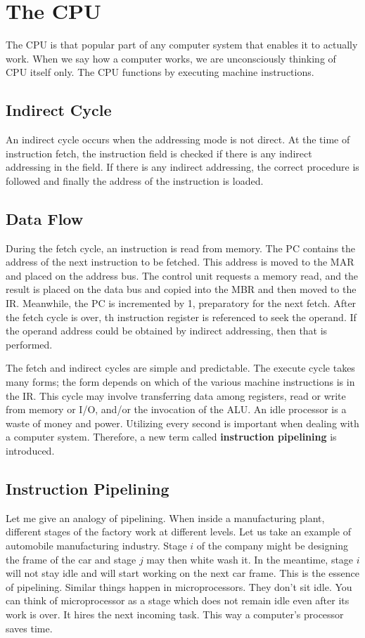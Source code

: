 \documentclass{article}
\begin{document}
\section{The CPU}
The CPU is that popular part of any computer system that enables it to actually work. When we say how a computer works, we are unconsciously thinking of CPU itself only. The CPU functions by executing machine instructions.

\subsection{Indirect Cycle}
An indirect cycle occurs when the addressing mode is not direct. At the time of instruction fetch, the instruction field is checked if there is any indirect addressing in the field. If there is any indirect addressing, the correct procedure is followed and finally the address of the instruction is loaded.

\subsection{Data Flow}
During the fetch cycle, an instruction is read from memory. The PC contains the address of the next instruction to be fetched. This address is moved to the MAR and placed on the address bus. The control unit requests a memory read, and the result is placed on the data bus and copied into the MBR and then moved to the IR. Meanwhile, the PC is incremented by 1, preparatory for the next fetch. After the fetch cycle is over, th instruction register is referenced to seek the operand. If the operand address could be obtained by indirect addressing, then that is performed. \par The fetch and indirect cycles are simple and predictable. The execute cycle takes many forms; the form depends on which of the various machine instructions is in the IR. This cycle may involve transferring data among registers, read or write from memory or I/O, and/or the invocation of the ALU. An idle processor is a waste of money and power. Utilizing every second is important when dealing with a computer system. Therefore, a new term called \textbf{instruction pipelining} is introduced.

\subsection{Instruction Pipelining}
Let me give an analogy of pipelining. When inside a manufacturing plant, different stages of the factory work at different levels. Let us take an example of automobile manufacturing industry. Stage $i$ of the company might be designing the frame of the car and stage $j$ may then white wash it. In the meantime, stage $i$ will not stay idle and will start working on the next car frame. This is the essence of pipelining. Similar things happen in microprocessors. They don't sit idle. You can think of microprocessor as a stage which does not remain idle even after its work is over. It hires the next incoming task. This way a computer's processor saves time. 
\end{document}

